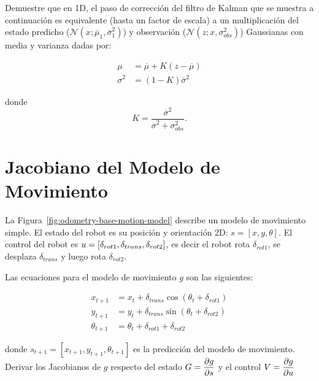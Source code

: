\documentclass[tp]{lcc}
\begin{document}
    Demuestre que en 1D, el paso de corrección del filtro de Kalman que se muestra a continuación es equivalente (hasta un factor de escala) a un multiplicación del estado predicho ($\mathcal{N}(x;\overline{\mu}_{1},\overline{\sigma}_{1}^{2})$) y observación ($\mathcal{N}(z;x, \sigma_{obs}^{2})$) Gaussianas con media y varianza dadas por:
    
    \begin{align*}
        \mu &= \overline{\mu} + K (z - \overline{\mu})\\
        \sigma^{2} &= (1 - K) \overline{\sigma}^{2}
    \end{align*}

    donde 
    \begin{equation*}
        K = \dfrac{\overline{\sigma}^{2}}{\overline{\sigma}^{2}+\sigma_{obs}^{2}}.
    \end{equation*}
	
	\section{Jacobiano del Modelo de Movimiento}
    
    La Figura~\ref{fig:odometry-base-motion-model} describe un modelo de movimiento simple. El estado del robot es su posición y orientación 2D: $s = [x, y, \theta]$. El control del robot es $u = [\delta_{rot1}, \delta_{trans}, \delta_{rot2}]$, es decir el robot rota $\delta_{rot1}$, se desplaza $\delta_{trans}$ y luego rota $\delta_{rot2}$.
    
    Las ecuaciones para el modelo de movimiento $g$ son las siguientes:
    
    \begin{align*}
        x_{t+1} &= x_{t} + \delta_{trans} \cos(\theta_{t} + \delta_{rot1})\\
        y_{t+1} &= y_{t} + \delta_{trans} \sin(\theta_{t} + \delta_{rot2})\\
        \theta_{t+1} &= \theta_{t} + \delta_{rot1} + \delta_{rot2}
    \end{align*}

    donde $s_{t+1} = [x_{t+1}, y_{t+1}, \theta_{t+1}]$ es la predicción del modelo de movimiento. Derivar los Jacobianos de $g$ respecto del estado $G = \dfrac{\partial g}{\partial s}$ y el control $V = \dfrac{\partial g}{\partial u}$
    
\end{document}
